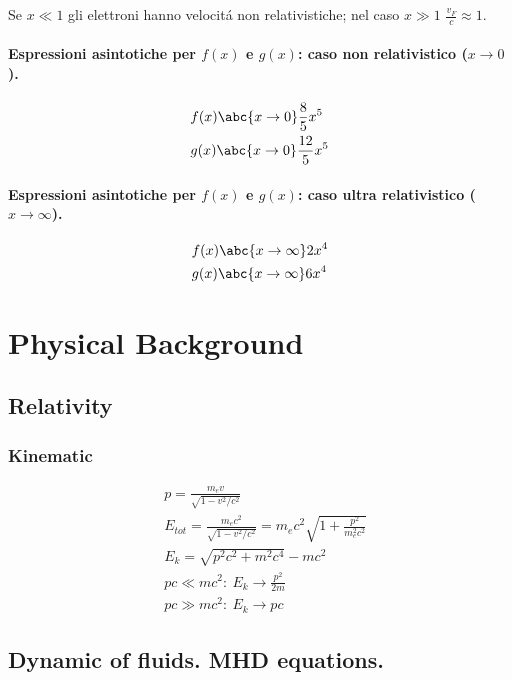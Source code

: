 Se $x\ll1$ gli elettroni hanno velocit\'a non relativistiche; nel caso $x\gg1$ $\frac{v_F}{c}\approx1$.

\subsection{Espressioni asintotiche per $f(x)$ e $g(x)$: caso non relativistico ($x\to0$).}

\begin{align*}
&f(x)\abc{x\to0}\frac{8}{5}x^5\\
&g(x)\abc{x\to0}\frac{12}{5}x^5
\end{align*}

\subsection{Espressioni asintotiche per $f(x)$ e $g(x)$: caso ultra relativistico ($x\to\infty$).}

\begin{align*}
&f(x)\abc{x\to\infty}2x^4\\
&g(x)\abc{x\to\infty}6x^4
\end{align*}

\part{Physical Background}


\chapter{Relativity}
\PartialToc

\section{Kinematic}

\begin{align*}
&p=\frac{m_ev}{\sqrt{1-v^2/c^2}}\\
&E_{tot}=\frac{m_ec^2}{\sqrt{1-v^2/c^2}}=m_ec^2\sqrt{1+\frac{p^2}{m_e^2c^2}}\\
&E_k=\sqrt{p^2c^2+m^2c^4}-mc^2\\
&pc\ll mc^2:\ E_k\to\frac{p^2}{2m}\\
&pc\gg mc^2:\ E_k\to pc
\end{align*}


\chapter{Dynamic of fluids. MHD equations.}
\PartialToc

